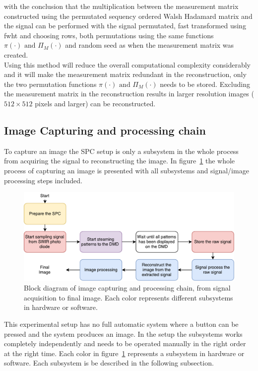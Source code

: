 with the conclusion that the multiplication between the measurement matrix constructed using the permutated sequency ordered Walsh Hadamard matrix and the signal can be performed with the signal permutated, fast transformed using fwht and choosing rows, both permutations using the same functions $\pi(\cdot) \text{ and } \Pi_M(\cdot)$ and random seed as when the measurement matrix was created.\\[0.1in]

Using this method will reduce the overall computational complexity considerably and it will make the measurement matrix redundant in the reconstruction, only the two permutation functions $\pi(\cdot) \text{ and } \Pi_M(\cdot)$ needs to be stored. Excluding the measurement matrix in the reconstruction results in larger resolution images ($512\times512$ pixels and larger) can be reconstructed. \cite{article:SRM_long, article:TVAL3}



\subsection{Image Capturing and processing chain}
To capture an image the SPC setup is only a subsystem in the whole process from acquiring the signal to reconstructing the image. In figure~\ref{fig:flow_chart} the whole process of capturing an image is presented with all subsystems and signal/image processing steps included.

\begin{figure}[H]
\includegraphics[width = 1\linewidth]{gfx/flowchart3.pdf}
\caption{Block diagram of image capturing and processing chain, from signal acquisition to final image. Each color represents different subsystems in hardware or software.}
	\label{fig:flow_chart}
\end{figure}

This experimental setup has no full automatic system where a button can be pressed and the system produces an image. In the setup the subsystems works completely independently and needs to be operated manually in the right order at the right time. Each color in figure~\ref{fig:flow_chart} represents a subsystem in hardware or software. Each subsystem is be described in the following subsection.

